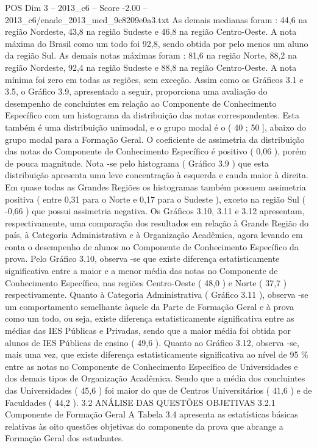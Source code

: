 \begin{textsample}{POS Dim 3 – 2013\_c6 – Score -2.00 – 2013\_c6/enade\_2013\_med\_9c8209e0a3.txt}
As demais medianas foram : 44,6 na região Nordeste, 43,8 na região Sudeste e 46,8 na região Centro-Oeste.
A nota máxima do Brasil como um todo foi 92,8, sendo obtida por pelo menos um aluno da região Sul.
As demais notas máximas foram : 81,6 na região Norte, 88,2 na região Nordeste, 92,4 na região Sudeste e 88,8 na região Centro-Oeste.
A nota mínima foi zero em todas as regiões, sem exceção.
Assim como os Gráficos 3.1 e 3.5, o Gráfico 3.9, apresentado a seguir, proporciona uma avaliação do desempenho de concluintes em relação ao Componente de Conhecimento Específico com um histograma da distribuição das notas correspondentes.
Esta também é uma distribuição unimodal, e o grupo modal é o ( 40 ; 50 ], abaixo do grupo modal para a Formação Geral.
O coeficiente de assimetria da distribuição das notas do Componente de Conhecimento Específico é positivo ( 0,06 ), porém de pouca magnitude.
Nota -se pelo histograma ( Gráfico 3.9 ) que esta distribuição apresenta uma leve concentração à esquerda e cauda maior à direita.
Em quase todas as Grandes Regiões os histogramas também possuem assimetria positiva ( entre 0,31 para o Norte e 0,17 para o Sudeste ), exceto na região Sul ( -0,66 ) que possui assimetria negativa.
Os Gráficos 3.10, 3.11 e 3.12 apresentam, respectivamente, uma comparação dos resultados em relação à Grande Região do país, à Categoria Administrativa e à Organização Acadêmica, agora levando em conta o desempenho de alunos no Componente de Conhecimento Específico da prova.
Pelo Gráfico 3.10, observa -se que existe diferença estatisticamente significativa entre a maior e a menor média das notas no Componente de Conhecimento Específico, nas regiões Centro-Oeste ( 48,0 ) e Norte ( 37,7 ) respectivamente.
Quanto à Categoria Administrativa ( Gráfico 3.11 ), observa -se um comportamento semelhante àquele da Parte de Formação Geral e à prova como um todo, ou seja, existe diferença estatisticamente significativa entre as médias das IES Públicas e Privadas, sendo que a maior média foi obtida por alunos de IES Públicas de ensino ( 49,6 ).
Quanto ao Gráfico 3.12, observa -se, mais uma vez, que existe diferença estatisticamente significativa ao nível de 95 \% entre as notas no Componente de Conhecimento Específico de Universidades e dos demais tipos de Organização Acadêmica.
Sendo que a média dos concluintes das Universidades ( 45,6 ) foi maior do que de Centros Universitários ( 41,6 ) e de Faculdades ( 44,2 ). 3.2 ANÁLISE DAS QUESTÕES OBJETIVAS 3.2.1 Componente de Formação Geral A Tabela 3.4 apresenta as estatísticas básicas relativas às oito questões objetivas do componente da prova que abrange a Formação Geral dos estudantes.

\end{textsample}
